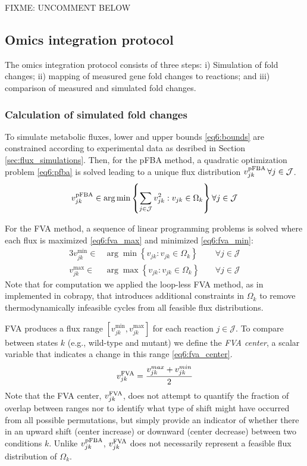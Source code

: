 FIXME: UNCOMMENT BELOW
\subsection{Omics integration protocol}\label{sec:proteomics_method}
The omics integration protocol consists of three steps: i) Simulation of fold changes; ii) mapping of measured gene fold changes to reactions; and iii) comparison of measured and simulated fold changes.

\subsubsection{Calculation of simulated fold changes}
To simulate metabolic fluxes, lower and upper bounds \eqref{eq6:bounds} are constrained according to experimental data as desribed in Section \ref{sec:flux_simulations}. Then, for the pFBA method, a quadratic optimization problem \eqref{eq6:pfba} is solved leading to a unique flux distribution $v_{jk}^{\mathrm{pFBA}}\, \forall j \in \mathcal{J}$.
\begin{equation}
    v_{jk}^{\mathrm{pFBA}} \in \arg \min \left\{ \sum_{j \in \mathcal{J}} v_{jk}^2: v_{jk} \in \Omega_k \right\} \forall j \in \mathcal{J} \label{eq6:pfba}
\end{equation}

For the FVA method, a sequence of linear programming problems is solved where each flux is maximized \eqref{eq6:fva_max} and minimized \eqref{eq6:fva_min}:
\begin{alignat}{3}
    v_{jk}^{\min} \in & \arg \min \left\{ v_{jk}: v_{jk} \in \Omega_k \right\} && \; \forall j \in \mathcal{J} \label{eq6:fva_min}\\
    v_{jk}^{\max} \in & \arg \max \left\{ v_{jk}: v_{jk} \in \Omega_k \right\} && \; \forall j \in \mathcal{J} \label{eq6:fva_max}
\end{alignat}
Note that for computation we applied the loop-less FVA method,\citep{schellenberger2011a, chan2018} as in implemented in \mbox{cobrapy},\citep{ebrahim2013}  that introduces additional constraints in $\Omega_k$ to remove thermodynamically infeasible cycles from all feasible flux distributions.

FVA produces a flux range $[v_{jk}^{\min}, v_{jk}^{\max}]$  for each reaction $j \in \mathcal{J}$. To compare between states $k$ (e.g., wild-type and mutant) we define the \emph{FVA center}, a scalar variable that indicates a change in this range \eqref{eq6:fva_center}.
\begin{equation}
    v_{jk}^{\mathrm{FVA}} = \frac{v_{jk}^{max} + v_{jk}^{min}}{2} \label{eq6:fva_center}
\end{equation}
Note that the FVA center, $v_{jk}^{\mathrm{FVA}}$, does not attempt to quantify the fraction of overlap between ranges nor to identify what type of shift might have occurred from all possible permutations, but simply provide an indicator of whether there in an upward shift (center increase) or downward (center decrease) between two conditions $k$.
Unlike $v_{jk}^{\mathrm{pFBA}}$, $v_{jk}^{\mathrm{FVA}}$ does not necessarily represent a feasible flux distribution of $\Omega_k$.


